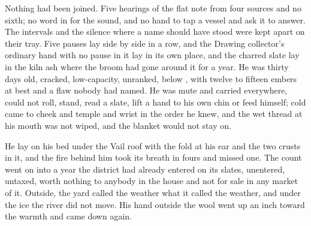\scenebreak

Nothing had been joined. Five hearings of the flat note from four sources and no sixth; no word in  for the sound, and no hand to tap a vessel and ask it to answer. The intervals and the silence where a name should have stood were kept apart on their tray. Five pauses lay side by side in a row, and the Drawing collector's ordinary hand with no pause in it lay in its own place, and the charred slate lay in the kiln ash where the broom had gone around it for a year. He was thirty days old, cracked, low-capacity, unranked, below , with twelve to fifteen embers at best and a flaw nobody had named. He was mute and carried everywhere, could not roll, stand, read a slate, lift a hand to his own chin or feed himself; cold came to cheek and temple and wrist in the order he knew, and the wet thread at his mouth was not wiped, and the blanket would not stay on.

He lay on his bed under the Vail roof with the fold at his ear and the two crusts in it, and the fire behind him took its breath in fours and missed one. The count went on into a year the district had already entered on its slates, unentered, untaxed, worth nothing to anybody in the house and not for sale in any market of it. Outside, the yard called the weather what it called the weather, and under the ice the river did not move. His hand outside the wool went up an inch toward the warmth and came down again.
